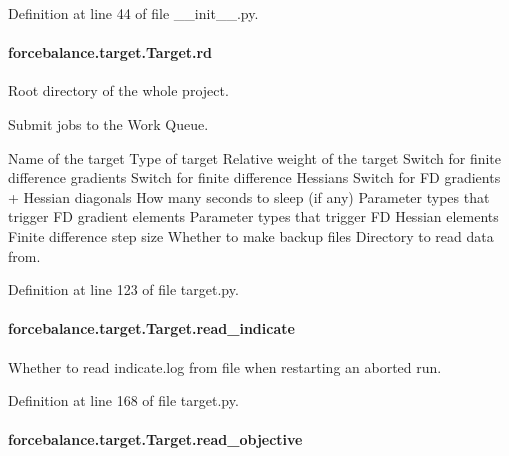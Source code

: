 Definition at line 44 of file \-\_\-\-\_\-init\-\_\-\-\_\-.\-py.

\hypertarget{classforcebalance_1_1target_1_1Target_a4edb69fbde792e9f2f27e54b7c978c8e}{
\paragraph[{rd}]{\setlength{\rightskip}{0pt plus 5cm}forcebalance.\-target.\-Target.\-rd\hspace{0.3cm}{\ttfamily [inherited]}}}\label{classforcebalance_1_1target_1_1Target_a4edb69fbde792e9f2f27e54b7c978c8e}


Root directory of the whole project. 

Submit jobs to the Work Queue.

Name of the target Type of target Relative weight of the target Switch for finite difference gradients Switch for finite difference Hessians Switch for F\-D gradients + Hessian diagonals How many seconds to sleep (if any) Parameter types that trigger F\-D gradient elements Parameter types that trigger F\-D Hessian elements Finite difference step size Whether to make backup files Directory to read data from.

Definition at line 123 of file target.\-py.

\hypertarget{classforcebalance_1_1target_1_1Target_aa8af57d5be669c4bb1c0cfd4b7a9220e}{
\paragraph[{read\-\_\-indicate}]{\setlength{\rightskip}{0pt plus 5cm}forcebalance.\-target.\-Target.\-read\-\_\-indicate\hspace{0.3cm}{\ttfamily [inherited]}}}\label{classforcebalance_1_1target_1_1Target_aa8af57d5be669c4bb1c0cfd4b7a9220e}


Whether to read indicate.\-log from file when restarting an aborted run. 



Definition at line 168 of file target.\-py.

\hypertarget{classforcebalance_1_1target_1_1Target_a22bdc4bbce2020ae44b44ad3e444fda6}{
\paragraph[{read\-\_\-objective}]{\setlength{\rightskip}{0pt plus 5cm}forcebalance.\-target.\-Target.\-read\-\_\-objective\hspace{0.3cm}{\ttfamily [inherited]}}}\label{classforcebalance_1_1target_1_1Target_a22bdc4bbce2020ae44b44ad3e444fda6}


